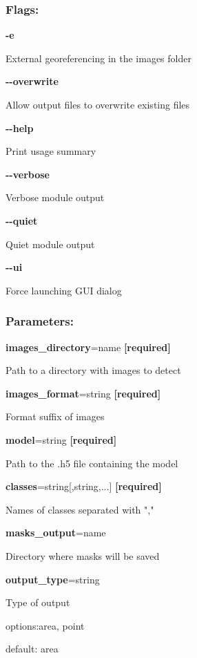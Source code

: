 \subsubsection*{Flags:}
\begin{flushleft}
  \textbf{-e}
  
  \tab External georeferencing in the images folder
  
  \textbf{-{}-overwrite}
  
  \tab Allow output files to overwrite existing files
  
  \textbf{-{}-help}
  
  \tab Print usage summary
  
  \textbf{-{}-verbose}
  
  \tab Verbose module output
  
  \textbf{-{}-quiet}
  
  \tab Quiet module output
  
  \textbf{-{}-ui}
  
  \tab Force launching GUI dialog
\end{flushleft}

\subsubsection*{Parameters:}

\begin{flushleft}
\textbf{images\_directory}=name \textbf{[required]}

\tab Path to a directory with images to detect

\textbf{images\_format}=string \textbf{[required]}

\tab Format suffix of images

\textbf{model}=string \textbf{[required]}

\tab Path to the .h5 file containing the model

\textbf{classes}=string[,string,...] \textbf{[required]}
           
\tab Names of classes separated with ","

\textbf{masks\_output}=name

\tab Directory where masks will be saved

\textbf{output\_type}=string

\tab Type of output

\tab options:area, point

\tab default: area
\end{flushleft}


